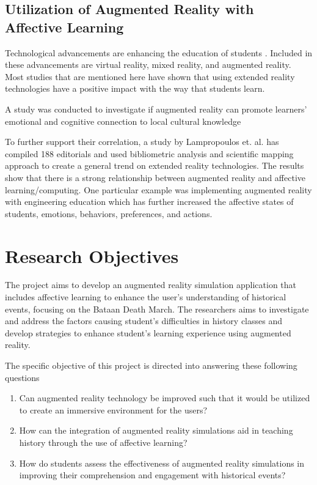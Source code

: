 \subsection{Utilization of Augmented Reality with Affective Learning}
Technological advancements are enhancing the education of students \cite{lamp2024}. Included in these advancements are virtual reality, mixed reality, and augmented reality. Most studies that are mentioned here have shown that using extended reality technologies have a positive impact with the way that students learn.

A study was conducted to investigate if augmented reality can promote learners' emotional and cognitive connection to local cultural knowledge

To further support their correlation, a study by Lampropoulos et. al. has compiled 188 editorials and used bibliometric analysis and scientific mapping approach to create a general trend on extended reality technologies. The results show that there is a strong relationship between augmented reality and affective learning/computing. One particular example was implementing augmented reality with engineering education which has further increased the affective states of students, emotions, behaviors, preferences, and actions.


\section{Research Objectives}
The project aims to develop an augmented reality simulation application that includes affective learning to enhance the user's understanding of historical events, focusing on the Bataan Death March. The researchers aims to investigate and address the factors causing student's difficulties in history classes and develop strategies to enhance student's learning experience using augmented reality.

The specific objective of this project is directed into answering these following questions
\begin{enumerate}
    \item Can augmented reality technology be improved such that it would be utilized to create an immersive environment for the users?
    \item How can the integration of augmented reality simulations aid in teaching history through the use of affective learning?
    \item How do students assess the effectiveness of augmented reality simulations in improving their comprehension and engagement with historical events? 
\end{enumerate}


